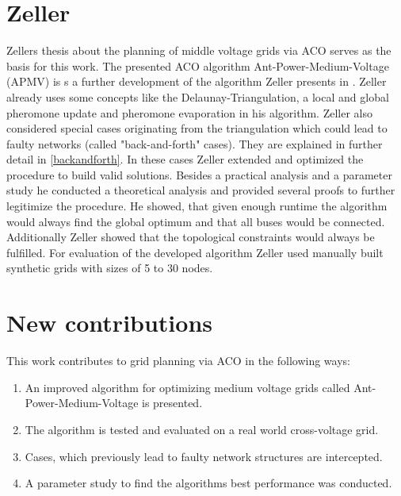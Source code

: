 \section{Zeller}
Zellers thesis about the planning of middle voltage grids via ACO serves as the basis for this work. The presented ACO algorithm Ant-Power-Medium-Voltage (APMV) is s a further development of the algorithm Zeller presents in \cite{zeller2021planung}. Zeller already uses some concepts like the Delaunay-Triangulation, a local and global pheromone update and pheromone evaporation in his algorithm. Zeller also considered special cases originating from the triangulation which could lead to faulty networks (called "back-and-forth" cases). They are explained in further detail in \ref{backandforth}. In these cases Zeller extended and optimized the procedure to build valid solutions. Besides a practical analysis and a parameter study he conducted a theoretical analysis and provided several proofs to further legitimize the procedure. He showed, that given enough runtime the algorithm would always find the global optimum and that all buses would be connected. Additionally Zeller showed that the topological constraints would always be fulfilled. For evaluation of the developed algorithm Zeller used manually built synthetic grids with sizes of 5 to 30 nodes.


\section{New contributions}
This work contributes to grid planning via ACO in the following ways:
\begin{enumerate}
	\setlength\itemsep{-0.5em}
	\item An improved algorithm for optimizing medium voltage grids called Ant-Power-Medium-Voltage is presented.
	\item The algorithm is tested and evaluated on a real world cross-voltage grid.
	\item Cases, which previously lead to faulty network structures are intercepted.
	\item A parameter study to find the algorithms best performance was conducted.
\end{enumerate}

